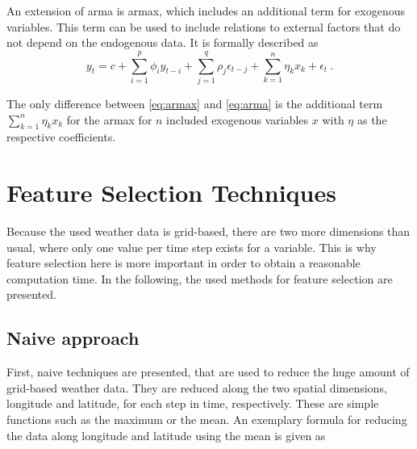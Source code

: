 An extension of \gls{arma} is \gls{armax}, which includes an additional term for exogenous variables. This term can be used to include relations to external factors that do not depend on the endogenous data. It is formally described as\\

\begin{equation}
y_t = c+\sum_{i=1}^{p}\phi_iy_{t-i}+\sum_{j=1}^{q}\rho_j\epsilon_{t-j}+\sum_{k=1}^{n}\eta_kx_k+\epsilon_t~.
\label{eq:armax}
\end{equation}

The only difference between \cref{eq:armax} and \cref{eq:arma} is the additional term $\sum_{k=1}^{n}\eta_kx_k$ for the \gls{armax} for $n$ included exogenous variables $x$ with $\eta$ as the respective coefficients.\\

%

\section{Feature Selection Techniques}
\label{sec:featsel}

Because the used weather data is grid-based, there are two more dimensions than usual, where only one value per time step exists for a variable. This is why feature selection here is more important in order to obtain a reasonable computation time. In the following, the used methods for feature selection are presented.\\

\subsection*{Naive approach}

First, naive techniques are presented, that are used to reduce the huge amount of grid-based weather data. They are reduced along the two spatial dimensions, longitude and latitude, for each step in time, respectively. These are simple functions such as the maximum or the mean. An exemplary formula for reducing the data along longitude and latitude using the mean is given as\\

